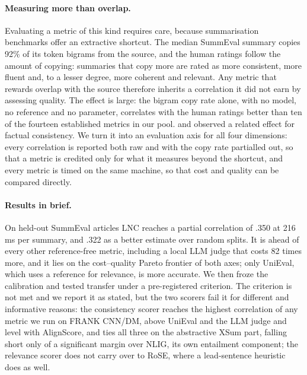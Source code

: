 \paragraph{Measuring more than overlap.} Evaluating a metric of this kind requires care, because summarisation benchmarks offer an extractive shortcut. The median SummEval summary copies 92\% of its token bigrams from the source, and the human ratings follow the amount of copying: summaries that copy more are rated as more consistent, more fluent and, to a lesser degree, more coherent and relevant. Any metric that rewards overlap with the source therefore inherits a correlation it did not earn by assessing quality. The effect is large: the bigram copy rate alone, with no model, no reference and no parameter, correlates with the human ratings better than ten of the fourteen established metrics in our pool. \citet{durmus2022spurious} and \citet{ladhak2022faithful} observed a related effect for factual consistency. We turn it into an evaluation axis for all four dimensions: every correlation is reported both raw and with the copy rate partialled out, so that a metric is credited only for what it measures beyond the shortcut, and every metric is timed on the same machine, so that cost and quality can be compared directly.

\paragraph{Results in brief.} On held-out SummEval articles LNC reaches a partial correlation of .350 at 216\,ms per summary, and .322 as a better estimate over random splits. It is ahead of every other reference-free metric, including a local LLM judge that costs 82 times more, and it lies on the cost--quality Pareto frontier of both axes; only UniEval, which uses a reference for relevance, is more accurate. We then froze the calibration and tested transfer under a pre-registered criterion. The criterion is not met and we report it as stated, but the two scorers fail it for different and informative reasons: the consistency scorer reaches the highest correlation of any metric we run on FRANK CNN/DM, above UniEval and the LLM judge and level with AlignScore, and ties all three on the abstractive XSum part, falling short only of a significant margin over NLIG, its own entailment component; the relevance scorer does not carry over to RoSE, where a lead-sentence heuristic does as well.

